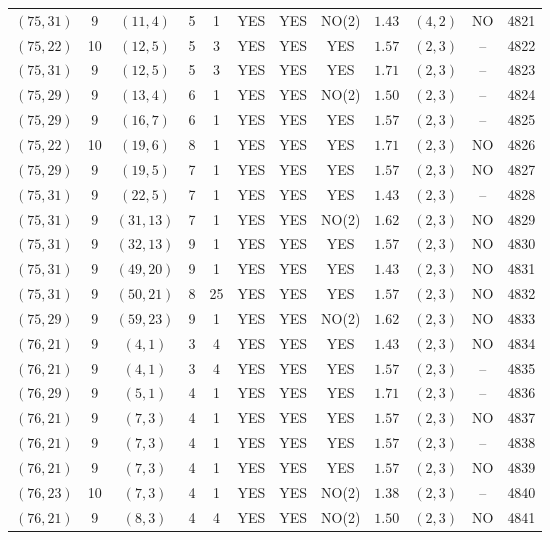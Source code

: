 \begin{longtable}{|c|c|c|c|c|c|c|c|c|c|c|c|}
$(75,31)$ & 9 & $(11,4)$ & 5 & 1 & YES & YES & NO(2) & $1.43$ & $(4,2)$ & NO & 4821\\
$(75,22)$ & 10 & $(12,5)$ & 5 & 3 & YES & YES & YES & $1.57$ & $(2,3)$ & -- & 4822\\
$(75,31)$ & 9 & $(12,5)$ & 5 & 3 & YES & YES & YES & $1.71$ & $(2,3)$ & -- & 4823\\
$(75,29)$ & 9 & $(13,4)$ & 6 & 1 & YES & YES & NO(2) & $1.50$ & $(2,3)$ & -- & 4824\\
$(75,29)$ & 9 & $(16,7)$ & 6 & 1 & YES & YES & YES & $1.57$ & $(2,3)$ & -- & 4825\\
$(75,22)$ & 10 & $(19,6)$ & 8 & 1 & YES & YES & YES & $1.71$ & $(2,3)$ & NO & 4826\\
$(75,29)$ & 9 & $(19,5)$ & 7 & 1 & YES & YES & YES & $1.57$ & $(2,3)$ & NO & 4827\\
$(75,31)$ & 9 & $(22,5)$ & 7 & 1 & YES & YES & YES & $1.43$ & $(2,3)$ & -- & 4828\\
$(75,31)$ & 9 & $(31,13)$ & 7 & 1 & YES & YES & NO(2) & $1.62$ & $(2,3)$ & NO & 4829\\
$(75,31)$ & 9 & $(32,13)$ & 9 & 1 & YES & YES & YES & $1.57$ & $(2,3)$ & NO & 4830\\
$(75,31)$ & 9 & $(49,20)$ & 9 & 1 & YES & YES & YES & $1.43$ & $(2,3)$ & NO & 4831\\
$(75,31)$ & 9 & $(50,21)$ & 8 & 25 & YES & YES & YES & $1.57$ & $(2,3)$ & NO & 4832\\
$(75,29)$ & 9 & $(59,23)$ & 9 & 1 & YES & YES & NO(2) & $1.62$ & $(2,3)$ & NO & 4833\\
$(76,21)$ & 9 & $(4,1)$ & 3 & 4 & YES & YES & YES & $1.43$ & $(2,3)$ & NO & 4834\\
$(76,21)$ & 9 & $(4,1)$ & 3 & 4 & YES & YES & YES & $1.57$ & $(2,3)$ & -- & 4835\\
$(76,29)$ & 9 & $(5,1)$ & 4 & 1 & YES & YES & YES & $1.71$ & $(2,3)$ & -- & 4836\\
$(76,21)$ & 9 & $(7,3)$ & 4 & 1 & YES & YES & YES & $1.57$ & $(2,3)$ & NO & 4837\\
$(76,21)$ & 9 & $(7,3)$ & 4 & 1 & YES & YES & YES & $1.57$ & $(2,3)$ & -- & 4838\\
$(76,21)$ & 9 & $(7,3)$ & 4 & 1 & YES & YES & YES & $1.57$ & $(2,3)$ & NO & 4839\\
$(76,23)$ & 10 & $(7,3)$ & 4 & 1 & YES & YES & NO(2) & $1.38$ & $(2,3)$ & -- & 4840\\
$(76,21)$ & 9 & $(8,3)$ & 4 & 4 & YES & YES & NO(2) & $1.50$ & $(2,3)$ & NO & 4841\\

\end{longtable}
